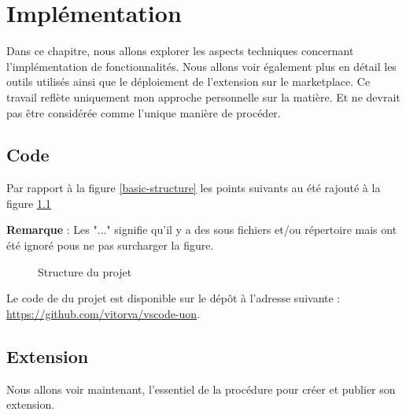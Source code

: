 \documentclass[
    iict, %
    il, %
]{heig-tb}
\begin{document}
\chapter{Implémentation}
Dans ce chapitre, nous allons explorer les aspects techniques concernant l'implémentation de fonctionnalités. Nous allons voir également plus en détail les outils utilisés ainsi que le déploiement de l'extension sur le marketplace.
Ce travail reflète uniquement mon approche personnelle sur la matière. Et ne devrait pas être considérée comme l'unique manière de procéder.

\section{Code}

Par rapport à la figure \ref{basic-structure}
les points suivants au été rajouté à la figure \ref{project-structure}

\textbf{Remarque} : Les "..." signifie qu'il y a des sous fichiers et/ou répertoire mais ont été ignoré pous ne pas surcharger
la figure.

\begin{figure}[!h]
    \centering
    \caption{Structure du projet}
    \label{project-structure}
\end{figure}

Le code de du projet est disponible sur le dépôt à l'adresse suivante : \url{https://github.com/vitorva/vscode-uon}.

\section{Extension}
Nous allons voir maintenant, l'essentiel de la procédure pour créer et publier son extension.
\end{document}
